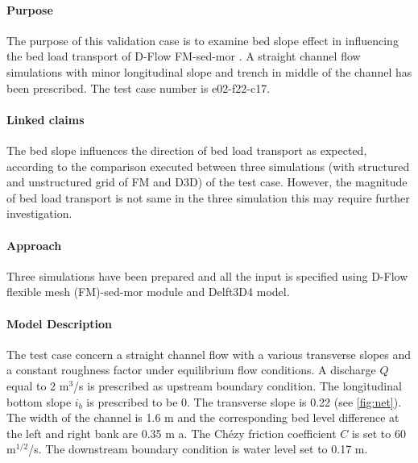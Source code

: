 \label{case:e02-f22-c17}

\paragraph*{Purpose}

The purpose of this validation case is to examine  bed slope effect in influencing the bed load transport of D-Flow FM-sed-mor . A straight channel flow simulations with minor longitudinal slope and trench in middle of the channel has been prescribed. The test case number is e02-f22-c17.
\paragraph*{Linked claims}
The bed slope influences the direction of bed load transport as expected, according to the comparison executed between three simulations (with structured and unstructured grid of FM and D3D) of the test case. However, the magnitude of bed load transport is not same in the three simulation this may require further investigation.
\paragraph*{Approach}
Three simulations have been prepared
and all the input is specified using D-Flow flexible mesh (FM)-sed-mor module and Delft3D4 model.

\paragraph*{Model Description}
The test case concern a straight channel flow with a various transverse slopes and a constant roughness factor under equilibrium flow conditions. A discharge $Q$ equal to 2 m$^3$/s is prescribed as upstream boundary condition. The longitudinal bottom slope $i_b$ is prescribed to be $0$. The transverse slope is 0.22  (see \ref{fig:net}). The width of the channel is 1.6 m and the corresponding bed level difference at the left and right bank are 0.35 m a. The Ch\'ezy friction coefficient $C$ is set to 60 m$^{1/2}$/s. The downstream boundary condition is water level set to 0.17 m.

